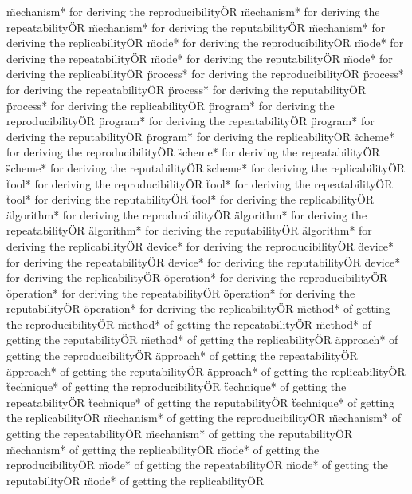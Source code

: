 \documentclass[
10pt, %
a4paper, %
oneside, %
headinclude,footinclude, %
BCOR5mm, %
]{scrartcl}
\begin{document}
\"mechanism* for deriving the reproducibility\" OR \"mechanism* for deriving the repeatability\" OR \"mechanism* for deriving the reputability\" OR \"mechanism* for deriving the replicability\" OR 
\"mode* for deriving the reproducibility\" OR \"mode* for deriving the repeatability\" OR \"mode* for deriving the reputability\" OR \"mode* for deriving the replicability\" OR 
\"process* for deriving the reproducibility\" OR \"process* for deriving the repeatability\" OR \"process* for deriving the reputability\" OR \"process* for deriving the replicability\" OR 
\"program* for deriving the reproducibility\" OR \"program* for deriving the repeatability\" OR \"program* for deriving the reputability\" OR \"program* for deriving the replicability\" OR 
\"scheme* for deriving the reproducibility\" OR \"scheme* for deriving the repeatability\" OR \"scheme* for deriving the reputability\" OR \"scheme* for deriving the replicability\" OR 
\"tool* for deriving the reproducibility\" OR \"tool* for deriving the repeatability\" OR \"tool* for deriving the reputability\" OR \"tool* for deriving the replicability\" OR 
\"algorithm* for deriving the reproducibility\" OR \"algorithm* for deriving the repeatability\" OR \"algorithm* for deriving the reputability\" OR \"algorithm* for deriving the replicability\" OR 
\"device* for deriving the reproducibility\" OR \"device* for deriving the repeatability\" OR \"device* for deriving the reputability\" OR \"device* for deriving the replicability\" OR 
\"operation* for deriving the reproducibility\" OR \"operation* for deriving the repeatability\" OR \"operation* for deriving the reputability\" OR \"operation* for deriving the replicability\" OR 
\"method* of getting the reproducibility\" OR \"method* of getting the repeatability\" OR \"method* of getting the reputability\" OR \"method* of getting the replicability\" OR 
\"approach* of getting the reproducibility\" OR \"approach* of getting the repeatability\" OR \"approach* of getting the reputability\" OR \"approach* of getting the replicability\" OR 
\"technique* of getting the reproducibility\" OR \"technique* of getting the repeatability\" OR \"technique* of getting the reputability\" OR \"technique* of getting the replicability\" OR 
\"mechanism* of getting the reproducibility\" OR \"mechanism* of getting the repeatability\" OR \"mechanism* of getting the reputability\" OR \"mechanism* of getting the replicability\" OR 
\"mode* of getting the reproducibility\" OR \"mode* of getting the repeatability\" OR \"mode* of getting the reputability\" OR \"mode* of getting the replicability\" OR 
\end{document}
